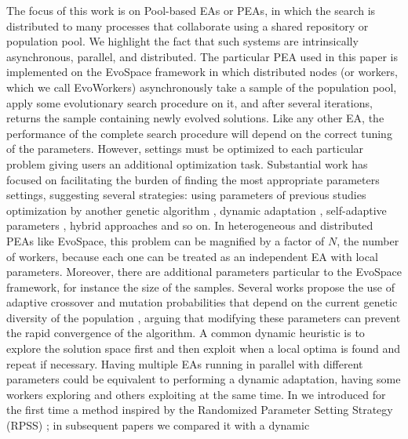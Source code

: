 \documentclass[conference]{IEEEtran}
\begin{document}
The focus of this work is on Pool-based EAs or PEAs, in which the search
is distributed to many processes that collaborate using a shared
repository or population pool. We highlight the fact that such
systems are intrinsically asynchronous, parallel, and distributed.
The particular PEA used in this paper is implemented on
the EvoSpace framework \cite{GValdez2015}
in which distributed nodes (or workers, which we call EvoWorkers) 
asynchronously take a sample of the population pool, apply some 
evolutionary search procedure 
on it, and after several iterations, returns the sample containing 
newly evolved solutions.
Like any other EA, the performance of the complete search procedure will depend
on the correct tuning of the parameters. However, settings
must be optimized to each particular problem \cite{de2007parameter}
giving users an additional optimization task.
Substantial work has focused on facilitating the burden of finding
the most appropriate parameters settings, suggesting several strategies:
using parameters of previous studies \cite{eiben1999parameter}
optimization by another genetic algorithm \cite{grefenstette1986optimization},
dynamic adaptation \cite{eiben1999parameter},
self-adaptive parameters \cite{pellerin2004self}, hybrid approaches \cite{de2007parameter} and so on.
In heterogeneous and distributed PEAs like EvoSpace, this problem can
be magnified by a factor of $N$, the number of workers, because each one
can be treated as an independent EA with local parameters. Moreover, there
are additional parameters particular to the EvoSpace framework,
for instance the size of the samples.
Several works propose the use of adaptive crossover and mutation probabilities
that depend on the current genetic diversity of the population \cite{pellerin2004self},
arguing that modifying these parameters can prevent the rapid convergence of the
algorithm.
A common dynamic heuristic is to explore the solution space first and then exploit
when a local optima is found and repeat if necessary.
Having multiple EAs running in parallel with different parameters could be
equivalent to performing a dynamic adaptation, having some workers exploring
and others exploiting at the same time.
In \cite{LNCS86720702} we introduced for the first time a method
inspired by the Randomized Parameter
Setting Strategy (RPSS) \cite{fuku1,fuku2}; in subsequent papers
\cite{hernandez2017randomized} we compared it with a dynamic
\end{document}
